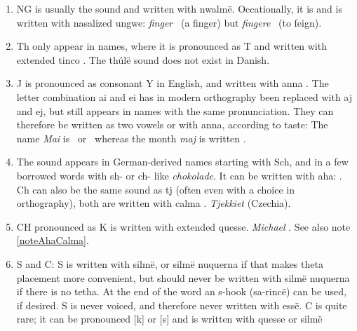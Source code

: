 \documentclass[a4paper]{article}
\begin{document}
\begin{enumerate}
  we attempt to preserve to pronunciation, but the original voiced sound
  \textipa{[Z]} does not exist in Danish).  While the soft G
  probably deserves several different tengwar, it is suggested to lump
  it all into unqu\"e \Tunque.\label{noteG}
  \item NG is usually the sound \textipa{[N]} and written with
    nwalm\"e.  Occationally, it is \textipa{[Ng]} and is written with
    nasalized ungwe: \emph{finger}
    \Tformen\Tnwalme\TTdot\Toore\TTacute ~(a finger) but
    \emph{fingere}
    \Tformen\Tungwe\TTnasalizer\TTdot\Troomen\TTacute\Ttelco\TTacute
    ~(to feign).\label{noteNG}
\item Th only appear in names, where it is pronounced as T and written
  with extended tinco \Textendedtinco.  The th\'ul\"e sound
  \textipa{[T]} does not exist in Danish.\label{noteTH}
\item J is pronounced as consonant Y in English, and written with anna
  \Tanna.  The letter combination ai and ei has in modern orthography
  been replaced with aj and ej, but still appears in names with the
  same pronunciation.  They can therefore be written as two vowels or
  with anna, according to taste: The name \emph{Mai} is
  \Tmalta\Ttelco\TTthreedots\Ttelco\TTdot ~or \Tmalta\Tanna\TTdot
  ~whereas the month \emph{maj} is written
  \Tmalta\Tanna\TTdot.\label{noteJ}
\item The sound \textipa{[S]} appears in German-derived names starting
  with Sch, and in a few borrowed words with sh- or ch- like
  \emph{chokolade}.  It can be written with aha:
  \Taha\Tquesse\TTrightcurl\Tlambe\TTrightcurl\Tanto\TTthreedots\TTdotbelow.
  Ch can also be the same sound as tj
  \textipa{[tS]} (often even with a choice in orthography), both are
  written with calma \Tcalma.\label{noteAhaCalma}  \emph{Tjekkiet}
  \Tcalma\Tquesse\TTacute\TTdoubler\Ttelco\TTdot\Ttinco\TTacute\Ts
  (Czechia).
\item CH pronounced as K is written with extended quesse.
  \emph{Michael}
  \Tmalta\Textendedquesse\TTdot\Ttelco\TTthreedots\TTdotbelow\Tlambe.
  See also note \ref{noteAhaCalma}. \label{noteCHasK}
\item S and C: S is written with silm\"e, or silm\"e nuquerna if that
  makes theta placement more convenient, but should never be written
  with silm\"e nuquerna if there is no tetha. At the end of the word
  an s-hook (sa-rinc\"e) can be used, if desired. S is never voiced,
  and therefore never written with ess\"e.  C is quite rare; it
  can be pronounced [k] or [s] and is written with quesse or silm\"e

\end{enumerate}
\end{document}
